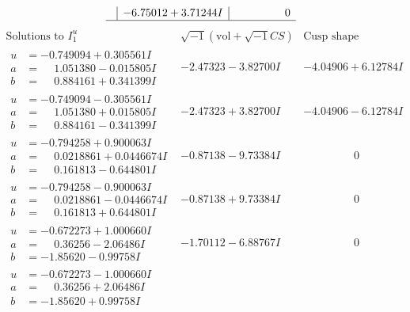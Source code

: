 \documentclass[1p]{elsarticle_modified}
\theoremstyle{definition}
\newcommand{\I}{\sqrt{-1}}
\begin{document}
$$\begin{array}{c|c|c}
 & -6.75012 + 3.71244 I & \phantom{-0.000000 } 0\\
 \hline 
 \end{array}$$\newpage$$\begin{array}{c|c|c}  
\text{Solutions to }I^u_{1}& \I (\text{vol} + \sqrt{-1}CS) & \text{Cusp shape}\\
 \hline 
\begin{aligned}
u &= -0.749094 + 0.305561 I \\
a &= \phantom{-}1.051380 - 0.015805 I \\
b &= \phantom{-}0.884161 + 0.341399 I\end{aligned}
 & -2.47323 - 3.82700 I & -4.04906 + 6.12784 I \\ \hline\begin{aligned}
u &= -0.749094 - 0.305561 I \\
a &= \phantom{-}1.051380 + 0.015805 I \\
b &= \phantom{-}0.884161 - 0.341399 I\end{aligned}
 & -2.47323 + 3.82700 I & -4.04906 - 6.12784 I \\ \hline\begin{aligned}
u &= -0.794258 + 0.900063 I \\
a &= \phantom{-}0.0218861 + 0.0446674 I \\
b &= \phantom{-}0.161813 - 0.644801 I\end{aligned}
 & -0.87138 - 9.73384 I & \phantom{-0.000000 } 0 \\ \hline\begin{aligned}
u &= -0.794258 - 0.900063 I \\
a &= \phantom{-}0.0218861 - 0.0446674 I \\
b &= \phantom{-}0.161813 + 0.644801 I\end{aligned}
 & -0.87138 + 9.73384 I & \phantom{-0.000000 } 0 \\ \hline\begin{aligned}
u &= -0.672273 + 1.000660 I \\
a &= \phantom{-}0.36256 - 2.06486 I \\
b &= -1.85620 - 0.99758 I\end{aligned}
 & -1.70112 - 6.88767 I & \phantom{-0.000000 } 0 \\ \hline\begin{aligned}
u &= -0.672273 - 1.000660 I \\
a &= \phantom{-}0.36256 + 2.06486 I \\
b &= -1.85620 + 0.99758 I\end{aligned}

\end{array}$$
\end{document}
